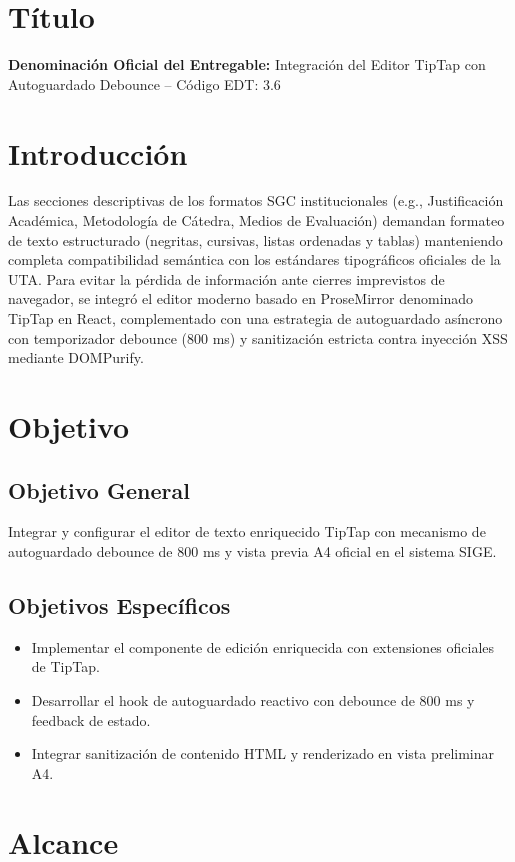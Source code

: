 \documentclass[12pt,a4paper]{article}
\begin{document}
\section{Título}
\textbf{Denominación Oficial del Entregable:} Integración del Editor TipTap con Autoguardado Debounce -- Código EDT: 3.6

\section{Introducción}
Las secciones descriptivas de los formatos SGC institucionales (e.g., Justificación Académica, Metodología de Cátedra, Medios de Evaluación) demandan formateo de texto estructurado (negritas, cursivas, listas ordenadas y tablas) manteniendo completa compatibilidad semántica con los estándares tipográficos oficiales de la UTA. Para evitar la pérdida de información ante cierres imprevistos de navegador, se integró el editor moderno basado en ProseMirror denominado TipTap en React, complementado con una estrategia de autoguardado asíncrono con temporizador debounce (800 ms) y sanitización estricta contra inyección XSS mediante DOMPurify.

\section{Objetivo}
\subsection{Objetivo General}
Integrar y configurar el editor de texto enriquecido TipTap con mecanismo de autoguardado debounce de 800 ms y vista previa A4 oficial en el sistema SIGE.
\subsection{Objetivos Específicos}
\begin{itemize}[leftmargin=1.5em, itemsep=2pt]
    \item Implementar el componente de edición enriquecida con extensiones oficiales de TipTap.
    \item Desarrollar el hook de autoguardado reactivo con debounce de 800 ms y feedback de estado.
    \item Integrar sanitización de contenido HTML y renderizado en vista preliminar A4.
\end{itemize}

\section{Alcance}
\end{document}
